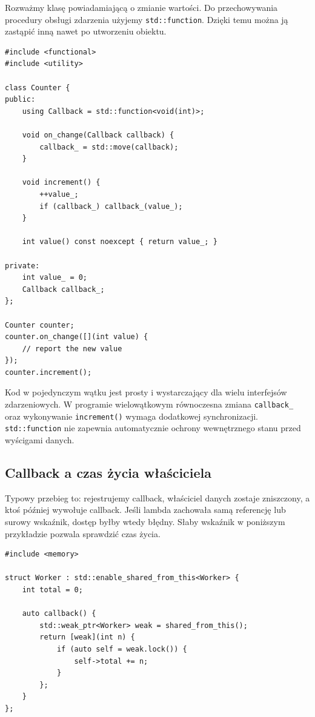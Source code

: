 Rozważmy klasę powiadamiającą o zmianie wartości. Do przechowywania
procedury obsługi zdarzenia użyjemy \texttt{std::function}. Dzięki
temu można ją zastąpić inną nawet po utworzeniu obiektu.

\begin{lstlisting}
#include <functional>
#include <utility>

class Counter {
public:
    using Callback = std::function<void(int)>;

    void on_change(Callback callback) {
        callback_ = std::move(callback);
    }

    void increment() {
        ++value_;
        if (callback_) callback_(value_);
    }

    int value() const noexcept { return value_; }

private:
    int value_ = 0;
    Callback callback_;
};

Counter counter;
counter.on_change([](int value) {
    // report the new value
});
counter.increment();
\end{lstlisting}

Kod w pojedynczym wątku jest prosty i wystarczający dla wielu
interfejsów zdarzeniowych. W programie wielowątkowym równoczesna
zmiana \texttt{callback\_} oraz wykonywanie \texttt{increment()}
wymaga dodatkowej synchronizacji. \texttt{std::function} nie zapewnia
automatycznie ochrony wewnętrznego stanu przed wyścigami danych.

\subsection{Callback a czas życia właściciela}

Typowy przebieg to: rejestrujemy callback, właściciel danych zostaje
zniszczony, a ktoś później wywołuje callback. Jeśli lambda zachowała
samą referencję lub surowy wskaźnik, dostęp byłby wtedy błędny.
Słaby wskaźnik w poniższym przykładzie pozwala sprawdzić czas życia.

\begin{lstlisting}
#include <memory>

struct Worker : std::enable_shared_from_this<Worker> {
    int total = 0;

    auto callback() {
        std::weak_ptr<Worker> weak = shared_from_this();
        return [weak](int n) {
            if (auto self = weak.lock()) {
                self->total += n;
            }
        };
    }
};
\end{lstlisting}


